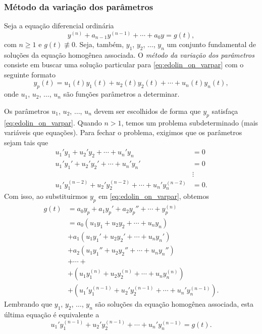 \subsubsection{Método da variação dos parâmetros}

Seja a equação diferencial ordinária
\begin{equation}\label{eq:edolin_on_varpar}
  y^{(n)} + a_{n-1}y^{(n-1)} + \cdots + a_0y = g(t),
\end{equation}
com $n\geq 1$ e $g(t)\not\equiv 0$. Seja, também, $y_1$, $y_2$, $\dotsc$, $y_n$ um conjunto fundamental de soluções da equação homogênea associada. O \emph{método da variação dos parâmetros} consiste em buscar uma solução particular para \eqref{eq:edolin_on_varpar} com o seguinte formato
\begin{equation}
  y_p(t) = u_1(t)y_1(t)+u_2(t)y_2(t)+\cdots +u_n(t)y_n(t),
\end{equation}
onde $u_1$, $u_2$, $\dotsc$, $u_n$ são funções parâmetros a determinar.

Os parâmetros $u_1$, $u_2$, $\dotsc$, $u_n$ devem ser escolhidos de forma que $y_p$ satisfaça \eqref{eq:edolin_on_varpar}. Quando $n>1$, temos um problema subdeterminado (mais variáveis que equações). Para fechar o problema, exigimos que os parâmetros sejam tais que
\begin{align}
  u_1'y_1+u_2'y_2+\cdots +u_n'y_n &= 0 \label{eq:edolin_on_varpar_eq0}\\
  u_1'y_1'+u_2'y_2'+\cdots +u_n'y_n' &= 0 \\
  &\vdots \\
  u_1'y_1^{(n-2)}+u_2'y_2^{(n-2)}+\cdots +u_n'y_n^{(n-2)} &= 0.\label{eq:edolin_on_varpar_eqn-1}
\end{align}
Com isso, ao substituirmos $y_p$ em \eqref{eq:edolin_on_varpar}, obtemos
\begin{align}
  g(t) &= a_0y_p+a_1y_p'+a_2y_p''+\cdots +y_p^{(n)}\\
       &= a_0(u_1y_1+u_2y_2+\cdots +u_ny_n) \\
       &+ a_1(u_1y_1'+u_2y_2'+\cdots +u_ny_n') \\
       &+ a_2(u_1y_1''+u_2y_2''+\cdots +u_ny_n'') \\
       &+ \cdots + \\
       &+ (u_1y_1^{(n)}+u_2y_2^{(n)}+\cdots +u_ny_n^{(n)}) \\
       &+ (u_1'y_1^{(n-1)}+u_2'y_2^{(n-1)}+\cdots +u_n'y_n^{(n-1)}).
\end{align}
Lembrando que $y_1$, $y_2$, $\dotsc$, $y_n$ são soluções da equação homogênea associada, esta última equação é equivalente a
\begin{equation}\label{eq:edolin_on_varpar_eqn}
  u_1'y_1^{(n-1)}+u_2'y_2^{(n-1)}+\cdots +u_n'y_n^{(n-1)} = g(t).
\end{equation}

